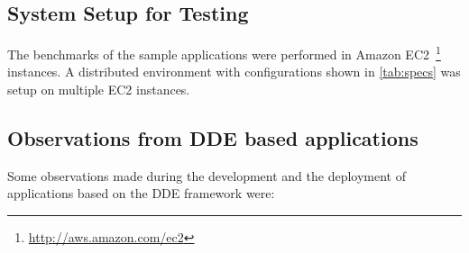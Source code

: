 \subsection{System Setup for Testing}
    The benchmarks of the sample applications were performed in Amazon EC2~\footnote{\url{http://aws.amazon.com/ec2}} instances. A distributed environment with configurations shown in \autoref{tab:specs} was setup on multiple EC2 instances.

\subsection{Observations from DDE based applications}
\label{subsec:result-framework}
   Some observations made during the development and the deployment of applications based on the DDE framework were:

